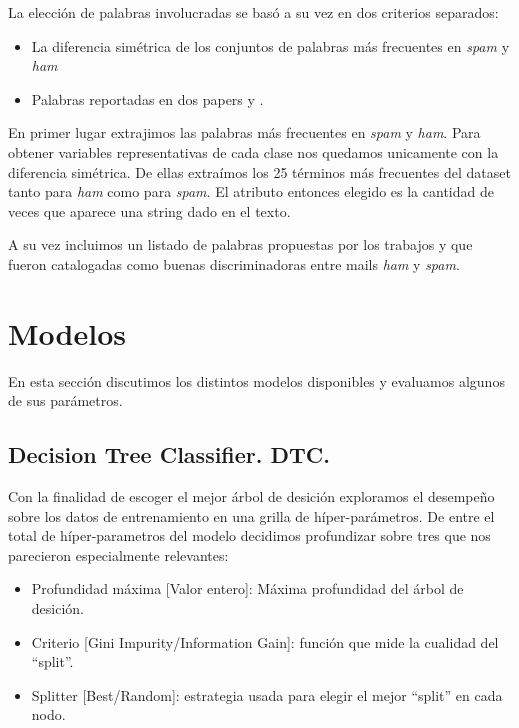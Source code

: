 \documentclass[a4paper,10pt]{article}
\begin{document}
\par La elección de palabras involucradas se basó a su vez en dos criterios separados: 
\begin{itemize}
 \item La diferencia sim\'etrica de los conjuntos de palabras m\'as frecuentes en \emph{spam} y \emph{ham}
\item Palabras reportadas en dos papers \cite{Gunal} y \cite{Vaughan}. 
\end{itemize}

En primer lugar extrajimos las palabras m\'as frecuentes en \emph{spam} y \emph{ham}. Para obtener variables representativas de cada clase nos quedamos unicamente con la diferencia sim\'etrica. De ellas extraímos los 25 términos más frecuentes del dataset tanto para \emph{ham} como para \emph{spam}. El atributo entonces elegido es la cantidad de veces que aparece una string dado en el texto. 

A su vez incluimos un listado de palabras propuestas por los trabajos \cite{Gunal} y \cite{Vaughan} que fueron catalogadas como buenas discriminadoras entre mails \emph{ham} y \emph{spam}. 



\section{Modelos} \label{sec:modelos}

En esta secci\'on discutimos los distintos modelos disponibles y evaluamos algunos de sus par\'ametros.  

\subsection{Decision Tree Classifier. DTC.}

\par Con la finalidad de escoger el mejor árbol de desición exploramos 
el desempeño sobre los datos de entrenamiento en una grilla de híper-parámetros.
De entre el total de híper-parametros del modelo decidimos profundizar sobre 
tres que nos parecieron especialmente relevantes:
\begin{itemize}
 \item Profundidad máxima [Valor entero]: Máxima profundidad del árbol de desición. 
 \item Criterio [Gini Impurity/Information Gain]: función que mide la cualidad 
del ``split''. 
  \item Splitter [Best/Random]: estrategia usada para elegir el mejor 
``split'' en cada nodo.
\end{itemize}
\end{document}
